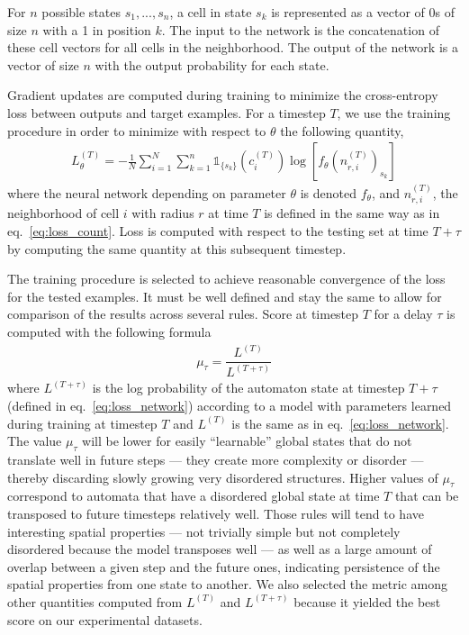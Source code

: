For $n$ possible states ${s_1, ..., s_n}$, a cell in state $s_k$ is represented
as a vector of 0s of size $n$ with a 1 in position $k$. The input to the network
is the concatenation of these cell vectors for all cells in the neighborhood.
The output of the network is a vector of size $n$ with the output probability
for each state.

Gradient updates are computed during training to minimize the cross-entropy loss
between outputs and target examples. For a timestep $T$, we use the training
procedure in order to minimize with respect to $\theta$ the following quantity,
\begin{align}
  L_\theta^{(T)} = - \frac{1}{N}\sum_{i=1}^N \sum_{k=1}^n
  \mathds{1}_{\{ s_k \}}\left(c_i^{(T)}\right)
  \log\left[f_\theta\left(n_{r,i}^{(T)}\right)_{s_k}\right]
  \label{eq:loss_network}
\end{align}
where the neural network depending on parameter $\theta$ is denoted $f_\theta$,
and $n_{r,i}^{(T)}$, the neighborhood of cell $i$ with radius $r$ at time $T$ is
defined in the same way as in eq.~\eqref{eq:loss_count}. Loss is computed with
respect to the testing set at time $T + \tau$ by computing the same quantity at
this subsequent timestep.

The training procedure is selected to achieve reasonable convergence of the loss
for the tested examples. It must be well defined and stay the same to allow for
comparison of the results across several rules. Score at timestep $T$ for a
delay $\tau$ is computed with the following formula
\begin{align}
  \mu_\tau = \dfrac{L^{(T)}}{L^{(T + \tau)}}
  \label{eq:main_metric}
\end{align}
where $L^{(T + \tau)}$ is the log probability of the automaton state at timestep
$T + \tau$ (defined in eq.~\eqref{eq:loss_network}) according to a model with
parameters learned during training at timestep $T$ and $L^{(T)}$ is the same as
in eq.~\eqref{eq:loss_network}. The value $\mu_\tau$ will be lower for easily
``learnable'' global states that do not translate well in future steps --- they
create more complexity or disorder --- thereby discarding slowly growing very
disordered structures. Higher values of $\mu_\tau$ correspond to automata that
have a disordered global state at time $T$ that can be transposed to future
timesteps relatively well. Those rules will tend to have interesting spatial
properties --- not trivially simple but not completely disordered because the
model transposes well --- as well as a large amount of overlap between a given
step and the future ones, indicating persistence of the spatial properties from
one state to another. We also selected the metric among other quantities
computed from $L^{(T)}$ and $L^{(T+\tau)}$ because it yielded the best score on
our experimental datasets.


